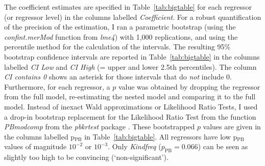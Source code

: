 \documentclass[USenglish]{article}
\newcommand{\Sub}[1]{\ensuremath{\mathrm{_{#1}}}}
\begin{document}
The coefficient estimates are specified in Table~\ref{tab:bigtable} for each regressor (or regressor level) in the columns labelled \textit{Coefficient}.
For a robust quantification of the precision of the estimation, I ran a parametric bootstrap (using the \textit{confint.merMod} function from \textit{lme4}) with 1,000 replications, and using the percentile method for the calculation of the intervals.
The resulting 95\% bootstrap confidence intervals are reported in Table~\ref{tab:bigtable} in the columns labelled \textit{CI Low} and \textit{CI High} (= upper and lower 2.5th percentiles).
The column \textit{CI contains 0} shows an asterisk for those intervals that do \textit{not} include 0.
Furthermore, for each regressor, a $p$ value was obtained by dropping the regressor from the full model, re-estimating the nested model and comparing it to the full model.
Instead of inexact Wald approximations or Likelihood Ratio Tests, I used a drop-in bootstrap replacement for the Likelihood Ratio Test from the function \textit{PBmodcomp} from the \textit{pbkrtest} package \citep{HalekohHojsgaard2014}.
These bootstrapped $p$ values are given in the columns labelled p\Sub{PB} in Table~\ref{tab:bigtable}.
All regressors have low p\Sub{PB} values of magnitude $10^{-2}$ or $10^{-3}$.
Only \textit{Kindfreq} ($p_{\text{PB}}=0.066$) can be seen as slightly too high to be convincing (`non-significant').
\end{document}
